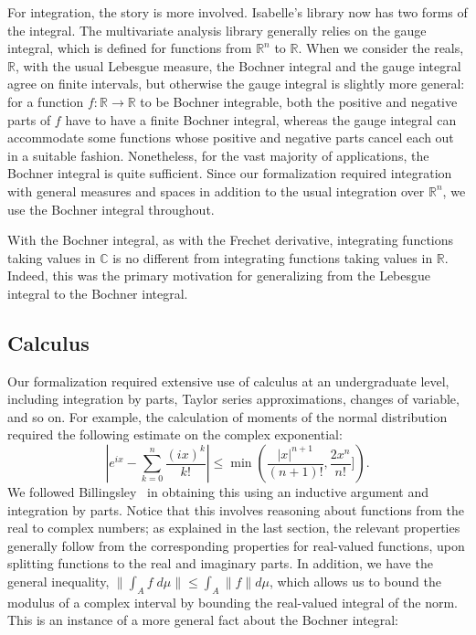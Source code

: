 \documentclass{svjour3}
\newcommand{\RR}{\mathbb{R}}
\newcommand{\CC}{\mathbb{C}}
\newcommand{\todo}[1]{\fxnote{#1}}
\begin{document}
For integration, the story is more involved. Isabelle's library now has two forms of the integral. The multivariate analysis library generally relies on the gauge integral, which is defined for functions from $\RR^n$ to $\RR$. When we consider the reals, $\RR$, with the usual Lebesgue measure, the Bochner integral and the gauge integral agree on finite intervals, but otherwise the gauge integral is slightly more general: for a function $f : \RR \to \RR$ to be Bochner integrable, both the positive and negative parts of $f$ have to have a finite Bochner integral, whereas the gauge integral can accommodate some functions whose positive and negative parts cancel each out in a suitable fashion. Nonetheless, for the vast majority of applications, the Bochner integral is quite sufficient. Since our formalization required integration with general measures and spaces in addition to the usual integration over $\RR^n$, we use the Bochner integral throughout.

With the Bochner integral, as with the Frechet derivative, integrating functions taking values in $\CC$ is no different from integrating functions taking values in $\RR$. Indeed, this was the primary motivation for generalizing from the Lebesgue integral to the Bochner integral.

\subsection{Calculus}
\label{subsection:calculus}

Our formalization required extensive use of calculus at an undergraduate level, including integration by parts, Taylor series approximations, changes of variable, and so on. For example, the calculation of moments of the normal distribution required the following estimate on the complex exponential:
\[
 \left| e^{ix} - \sum_{k=0}^n \frac{(ix)^k}{k!} \right| \le \min\left(\frac{|x|^{n+1}}{(n+1)!}, \frac{2 x^n}{n!}]\right).
\]
We followed Billingsley~\cite[Section 26]{billingsley:95} in obtaining this using an inductive argument and integration by parts. Notice that this involves reasoning about functions from the real to complex numbers; as explained in the last section, the relevant properties generally follow from the corresponding properties for real-valued functions, upon splitting functions to the real and imaginary parts. In addition, we have the general inequality, $\| \int_A f \; d\mu \| \le \int_A \| f \| d\mu$, which allows us to bound the modulus of a complex interval by bounding the real-valued integral of the norm. This is an instance of a more general fact about the Bochner integral:
\begin{quote}
\todo{Insert integral-norm-bound}
\end{quote}
\end{document}
